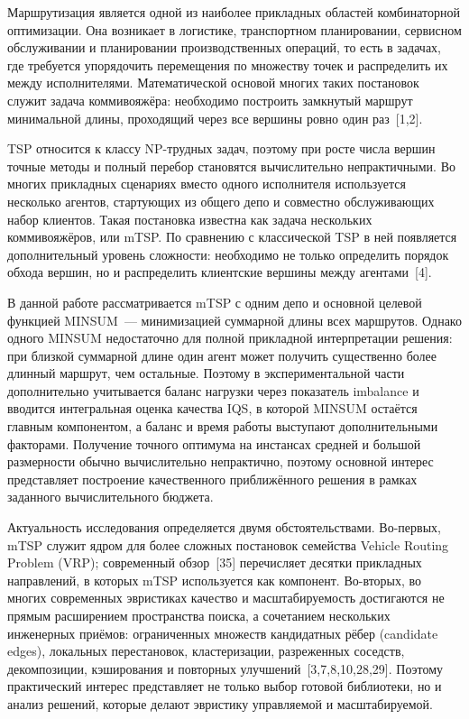 \documentclass[14pt,a4paper]{extarticle}
\newcommand{\source}[1]{[#1]}
\begin{document}
Маршрутизация является одной из наиболее прикладных областей комбинаторной оптимизации. Она возникает в логистике, транспортном планировании, сервисном обслуживании и планировании производственных операций, то есть в задачах, где требуется упорядочить перемещения по множеству точек и распределить их между исполнителями. Математической основой многих таких постановок служит задача коммивояжёра: необходимо построить замкнутый маршрут минимальной длины, проходящий через все вершины ровно один раз~\source{1,2}.

TSP относится к классу NP-трудных задач, поэтому при росте числа вершин точные методы и полный перебор становятся вычислительно непрактичными. Во многих прикладных сценариях вместо одного исполнителя используется несколько агентов, стартующих из общего депо и совместно обслуживающих набор клиентов. Такая постановка известна как задача нескольких коммивояжёров, или mTSP. По сравнению с классической TSP в ней появляется дополнительный уровень сложности: необходимо не только определить порядок обхода вершин, но и распределить клиентские вершины между агентами~\source{4}.

В данной работе рассматривается mTSP с одним депо и основной целевой функцией MINSUM~--- минимизацией суммарной длины всех маршрутов. Однако одного MINSUM недостаточно для полной прикладной интерпретации решения: при близкой суммарной длине один агент может получить существенно более длинный маршрут, чем остальные. Поэтому в экспериментальной части дополнительно учитывается баланс нагрузки через показатель imbalance и вводится интегральная оценка качества IQS, в которой MINSUM остаётся главным компонентом, а баланс и время работы выступают дополнительными факторами. Получение точного оптимума на инстансах средней и большой размерности обычно вычислительно непрактично, поэтому основной интерес представляет построение качественного приближённого решения в рамках заданного вычислительного бюджета.

Актуальность исследования определяется двумя обстоятельствами. Во-первых, mTSP служит ядром для более сложных постановок семейства Vehicle Routing Problem (VRP); современный обзор~\source{35} перечисляет десятки прикладных направлений, в которых mTSP используется как компонент. Во-вторых, во многих современных эвристиках качество и масштабируемость достигаются не прямым расширением пространства поиска, а сочетанием нескольких инженерных приёмов: ограниченных множеств кандидатных рёбер (candidate edges), локальных перестановок, кластеризации, разреженных соседств, декомпозиции, кэширования и повторных улучшений~\source{3,7,8,10,28,29}. Поэтому практический интерес представляет не только выбор готовой библиотеки, но и анализ решений, которые делают эвристику управляемой и масштабируемой.
\end{document}
